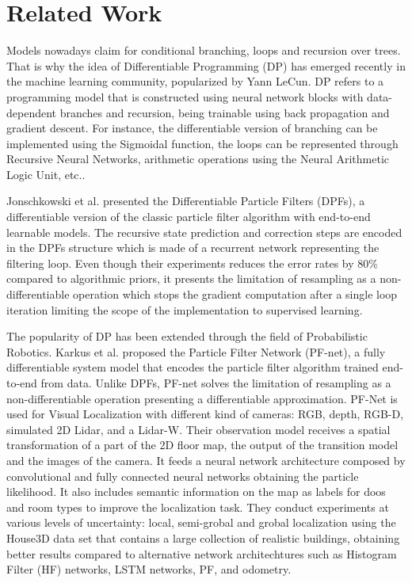 \section{Related Work}

Models nowadays claim for conditional branching, loops and recursion over trees\cite{inproceedings:ML-ProgrammingLang}. That is why the idea of Differentiable Programming (DP) has emerged recently in the machine learning community, popularized by Yann LeCun\cite{LeCunn:2018}. DP refers to a programming model that is constructed using neural network blocks with data-dependent branches and recursion, being trainable using back propagation and gradient descent\cite{NIPS2018_8221}. For instance, the differentiable version of branching can be implemented using the Sigmoidal function, the loops can be represented through Recursive Neural Networks, arithmetic operations using the Neural Arithmetic Logic Unit, etc.\cite{Scardapane:2019}. 

Jonschkowski et al.\cite{DBLP:journals/corr/abs-1805-11122} presented the Differentiable Particle Filters (DPFs), a differentiable version of the classic particle filter algorithm with end-to-end learnable models. The recursive state prediction and correction steps are encoded in the DPFs structure which is made of a recurrent network representing the filtering loop. Even though their experiments reduces the error rates by 80\% compared to algorithmic priors, it presents the limitation of resampling as a non-differentiable operation which stops the gradient computation after a single loop iteration limiting the scope of the implementation to supervised learning.

The popularity of DP has been extended through the field of Probabilistic Robotics. Karkus et al.\cite{karkus2018particle} proposed the Particle Filter Network (PF-net), a fully differentiable system model that encodes the particle filter algorithm trained end-to-end from data. Unlike DPFs, PF-net  solves the limitation of resampling as a non-differentiable operation presenting a differentiable approximation. PF-Net is used for Visual Localization with different kind of cameras: RGB, depth, RGB-D, simulated 2D Lidar, and a Lidar-W. Their observation model receives a spatial transformation of a part of the 2D floor map, the output of the transition model and the images of the camera. It feeds a neural network architecture composed by convolutional and fully connected neural networks obtaining the particle likelihood. It also includes semantic information on the map as labels for doos and room types to improve the localization task. They conduct experiments at various levels of uncertainty: local, semi-grobal and grobal localization using the House3D data set\cite{YiHouse3D} that contains a large collection of realistic buildings, obtaining better results compared to alternative network architechtures such as Histogram Filter (HF) networks\cite{Jonschkowski2017EndtoEndLH}, LSTM networks\cite{HochreiterLSTM}, PF, and odometry.













